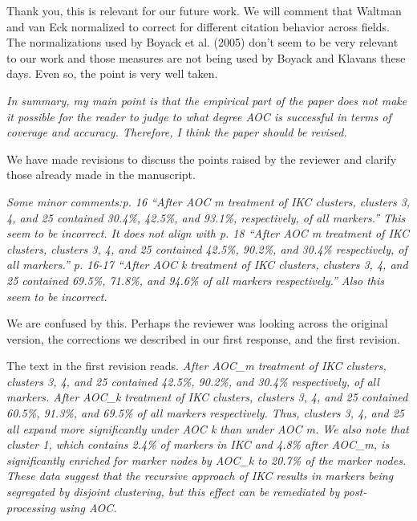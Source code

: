 \documentclass[11pt, oneside]{article}   	%
\begin{document}
 \vspace{2 mm} 
 Thank you, this is relevant for our future work. We will comment that Waltman and van Eck normalized to correct for different citation behavior across fields. The normalizations used by Boyack et al. (2005) don't seem to be very relevant to our work and those measures are not being used by Boyack and Klavans these days. Even so, the point is very well taken. 

\vspace{2 mm} 
 \emph{In summary, my main point is that the empirical part of the paper does not make it possible for the reader to judge to what degree AOC is successful in terms of coverage and accuracy. Therefore, I think the paper should be revised.}  
 
 \vspace{2 mm} 
 We have made revisions to discuss the points raised by the reviewer and clarify those already made in the manuscript.

\vspace{2 mm} 
 \emph{Some minor comments:p. 16 “After AOC m treatment of IKC clusters, clusters 3, 4, and 25 contained 30.4\%, 42.5\%, and 93.1\%, respectively, of all markers.” This seem to be incorrect. It does not align with p. 18 “After AOC m treatment of IKC clusters, clusters 3, 4, and 25 contained 42.5\%, 90.2\%, and 30.4\% respectively, of all markers.” p. 16-17 “After AOC k treatment of IKC clusters, clusters 3, 4, and 25 contained 69.5\%, 71.8\%, and 94.6\% of all markers respectively.” Also this seem to be incorrect.}

We are confused by this. Perhaps the reviewer was looking across the original version, the corrections we described in our first response, and the first revision. 

The text in the first revision reads. \emph{After AOC\_m treatment of IKC clusters, clusters 3, 4, and 25 contained 42.5\%, 90.2\%, and 30.4\% respectively, of all markers. After AOC\_k treatment of IKC clusters, clusters 3, 4, and 25 contained 60.5\%, 91.3\%, and 69.5\% of all markers respectively. Thus, clusters 3, 4, and 25 all expand more significantly under AOC k than under AOC m. We also note that cluster 1, which contains 2.4\% of markers in IKC and 4.8\% after AOC\_m, is significantly enriched for marker nodes by AOC\_k to 20.7\% of the marker nodes. These data suggest that the recursive approach of IKC results in markers being segregated by disjoint clustering, but this effect can be remediated by post-processing using AOC.}
\end{document}

